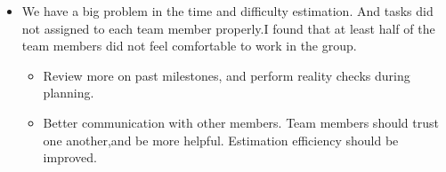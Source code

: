 \documentclass{article}
\begin{document}
\begin{itemize}
   \item We have a big problem in the time and difficulty estimation. And tasks did not assigned to  each team        member properly.I found that at least half of the  team members did not feel comfortable to work in the       group. 
      \begin{itemize}
         \item Review more on past milestones, and perform reality checks during planning.
      \end{itemize}

     \begin{itemize}
        \item  Better communication with other members.
          Team members should trust one another,and be more helpful.
          Estimation efficiency should be improved.       
     \end{itemize}
\end{itemize}
\end{document}
